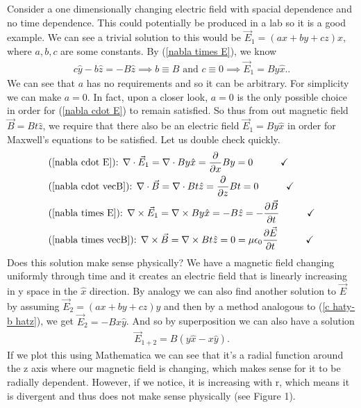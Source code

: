 \documentclass[11pt]{article}
\begin{document}
Consider a one dimensionally changing electric field with spacial dependence and no time dependence. This could potentially be produced in a lab so it is a good example. We can see a trivial solution to this would be $\vec{E}_1 = (ax+by+cz) \hat{x}$, where $a,b,c$ are some constants. By (\ref{nabla times E}), we know 
\begin{align}
c \hat{y}-b \hat{z} = -B \hat{z} \implies b \equiv B \textrm{ and } c \equiv 0 \implies \vec{E}_1 = B y\hat{x}. \label{c haty-b hatz}.
\end{align}
We can see that $a$ has no requirements and so it can be arbitrary. For simplicity we can make $a=0$. In fact, upon a closer look, $a=0$ is the only possible choice in order for (\ref{nabla cdot E}) to remain satisfied. So thus from out magnetic field $\vec{B} = Bt\hat{z}$, we require that there also be an electric field $\vec{E}_1=By \hat{x}$ in order for Maxwell's equations to be satisfied. Let us double check quickly. 
\begin{align}
&\textrm{(\ref{nabla cdot E}): }\nabla \cdot \vec{E}_1 = \nabla \cdot By \hat{x} = \frac{\partial}{\partial x} By = 0 \hspace{1cm} \checkmark \\
&\textrm{(\ref{nabla cdot vecB}): } \nabla \cdot \vec{B} = \nabla \cdot Bt \hat{z} = \frac{\partial}{\partial z} Bt = 0 \hspace{1cm} \checkmark \\
&\textrm{(\ref{nabla times E}): } \nabla \times \vec{E}_1 = \nabla \times B y \hat{x} = -B \hat{z} = -\frac{\partial \vec{B}}{\partial t}   \hspace{1cm} \checkmark \\
&\textrm{(\ref{nabla times vecB}): } \nabla \times \vec{B} = \nabla \times Bt\hat{z} = 0 = \mu\epsilon_0\frac{\partial \vec{E}}{\partial t}\hspace{1cm} \checkmark 
\end{align}
Does this solution make sense physically? We have a magnetic field changing uniformly through time and it creates an electric field that is linearly increasing in y space in the $\hat{x}$ direction. By analogy we can also find another solution to $\vec{E}$ by assuming $\vec{E}_2 = (ax+by+cz)\hat{y}$ and then by a method analogous to (\ref{c haty-b hatz}), we get $\vec{E}_2 = -Bx\hat{y}$. And so by superposition we can also have a solution
\begin{align}
\vec{E}_{1+2} = B(y \hat{x}-x\hat{y}).
\end{align}
If we plot this using Mathematica we can see that it's a radial function around the z axis where our magnetic field is changing, which makes sense for it to be radially dependent. However, if we notice, it is increasing with r, which means it is divergent and thus does not make sense physically (see Figure 1).
\end{document}
